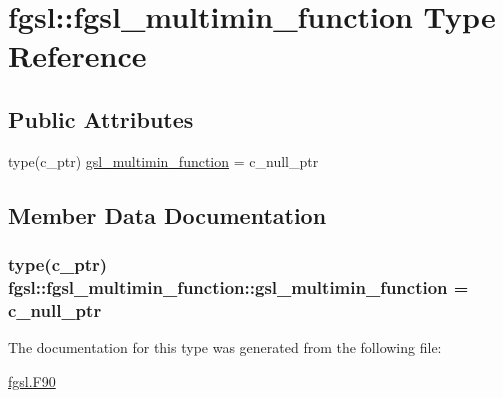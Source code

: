 \hypertarget{structfgsl_1_1fgsl__multimin__function}{\section{fgsl\-:\-:fgsl\-\_\-multimin\-\_\-function Type Reference}
\label{structfgsl_1_1fgsl__multimin__function}
}
\subsection*{Public Attributes}
\begin{DoxyCompactItemize}
\item 
type(c\-\_\-ptr) \hyperlink{structfgsl_1_1fgsl__multimin__function_a4596d1a6c7d683c0160678df1df7a91e}{gsl\-\_\-multimin\-\_\-function} = c\-\_\-null\-\_\-ptr
\end{DoxyCompactItemize}


\subsection{Member Data Documentation}
\hypertarget{structfgsl_1_1fgsl__multimin__function_a4596d1a6c7d683c0160678df1df7a91e}{
\subsubsection[{gsl\-\_\-multimin\-\_\-function}]{\setlength{\rightskip}{0pt plus 5cm}type(c\-\_\-ptr) fgsl\-::fgsl\-\_\-multimin\-\_\-function\-::gsl\-\_\-multimin\-\_\-function = c\-\_\-null\-\_\-ptr}}\label{structfgsl_1_1fgsl__multimin__function_a4596d1a6c7d683c0160678df1df7a91e}


The documentation for this type was generated from the following file\-:\begin{DoxyCompactItemize}
\item 
\hyperlink{fgsl_8F90}{fgsl.\-F90}\end{DoxyCompactItemize}
